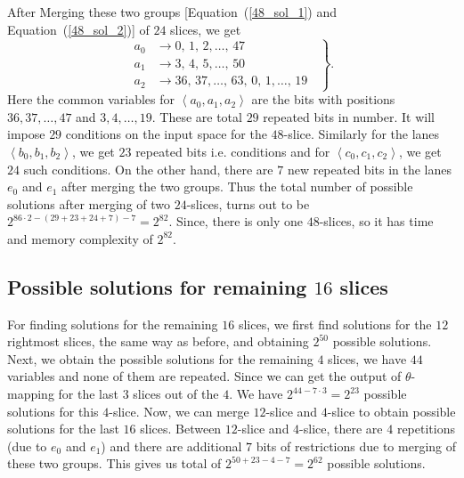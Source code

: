After Merging these two groups [Equation~(\ref{48_sol_1}) and 
Equation~(\ref{48_sol_2})] of $24$ slices, we get
\begin{equation}
	\left.
	\begin{aligned}       
    a_0 &\rightarrow 0,\, 1,\, 2,\ldots ,\, 47\\
    a_1 & \rightarrow 3,\, 4,\, 5,\ldots ,\, 50\\
    a_2 & \rightarrow 36,\, 37,\ldots,\, 63,\, 0,\, 1,\ldots ,\, 19
    \end{aligned}
	\;\;\right\}.
\end{equation}
Here the common variables for $\left< a_0, a_1,a_2\right>$ are the bits with positions
$36, 37 ,\ldots, 47$ and $ 3, 4,\ldots,19$. These are total $29$ repeated bits in number. It will impose $29$ conditions on the input space for the $48$-slice.
Similarly for the lanes $\left< b_0, b_1,b_2\right>$, we get $23$ repeated bits i.e. conditions and for $\left< c_0, c_1,c_2 \right>$, we get $24$ such conditions.
On the other hand, there are $7$ new repeated bits in the lanes $e_0$ and $e_1$ after merging the two groups. Thus the total number of possible solutions after merging of two $24$-slices, turns out to be $2^{86\cdot 2 - (29 + 23 + 24 + 7) - 7 } = 2^{82}$. Since, there is only one $48$-slices, so it has time and memory complexity of $2^{82}$.

\subsection{Possible solutions for remaining $16$ slices} 
For finding solutions for the remaining $16$ slices, we first find solutions for the $12$ rightmost slices, the same way as before, and obtaining $2^{50}$ possible solutions. 
Next, we obtain the possible solutions for the remaining $4$ slices, we have $44$ variables and none of them are repeated. Since we can get the output of $\theta$-mapping for the last $3$ slices out of the $4$. We have  $2^{44 - 7\cdot 3} = 2^{23}$ possible solutions for this $4$-slice.
Now, we can merge $12$-slice and $4$-slice to obtain possible solutions for the last $16$ slices. Between $12$-slice and $4$-slice, there are $4$ repetitions (due to $e_0$ and $e_1$) and there are additional $7$ bits of restrictions due to merging of these two groups. This gives us total of $2^{50 + 23 - 4 -7} = 2^{62}$ possible solutions.


